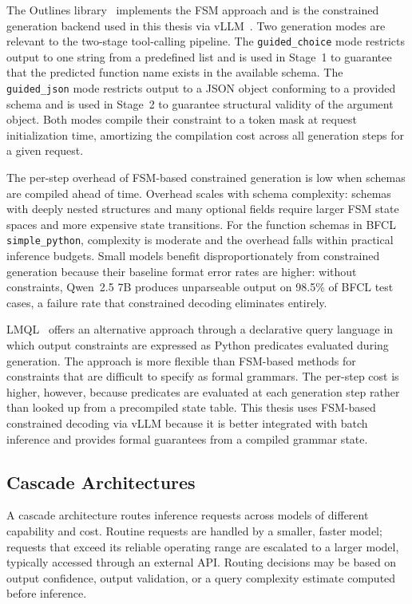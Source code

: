 The Outlines library~\cite{outlines2024} implements the FSM approach
and is the constrained generation backend used in this thesis
via vLLM~\cite{kwon2023vllm}. Two generation modes are relevant to
the two-stage tool-calling pipeline. The \texttt{guided\_choice} mode
restricts output to one string from a predefined list and is used in
Stage~1 to guarantee that the predicted function name exists in the
available schema. The \texttt{guided\_json} mode restricts output to
a JSON object conforming to a provided schema and is used in Stage~2
to guarantee structural validity of the argument object. Both modes
compile their constraint to a token mask at request initialization
time, amortizing the compilation cost across all generation steps for
a given request.

The per-step overhead of FSM-based constrained generation is low when
schemas are compiled ahead of time. Overhead scales with schema
complexity: schemas with deeply nested structures and many optional
fields require larger FSM state spaces and more expensive state
transitions. For the function schemas in BFCL \texttt{simple\_python},
complexity is moderate and the overhead falls within practical
inference budgets. Small models benefit disproportionately from
constrained generation because their baseline format error rates are
higher: without constraints, Qwen~2.5 7B produces unparseable output
on 98.5\% of BFCL test cases, a failure rate that constrained
decoding eliminates entirely.

LMQL~\cite{beurer2023lmql} offers an alternative approach through
a declarative query language in which output constraints are expressed
as Python predicates evaluated during generation. The approach is
more flexible than FSM-based methods for constraints that are
difficult to specify as formal grammars. The per-step cost is higher,
however, because predicates are evaluated at each generation step
rather than looked up from a precompiled state table. This thesis
uses FSM-based constrained decoding via vLLM because it is better
integrated with batch inference and provides formal guarantees from a
compiled grammar state.

\subsection{Cascade Architectures}

A cascade architecture routes inference requests across models of
different capability and cost. Routine
requests are handled by a smaller, faster model; requests that exceed
its reliable operating range are escalated to a larger model,
typically accessed through an external API. Routing decisions may be
based on output confidence, output validation, or a query complexity
estimate computed before inference.

